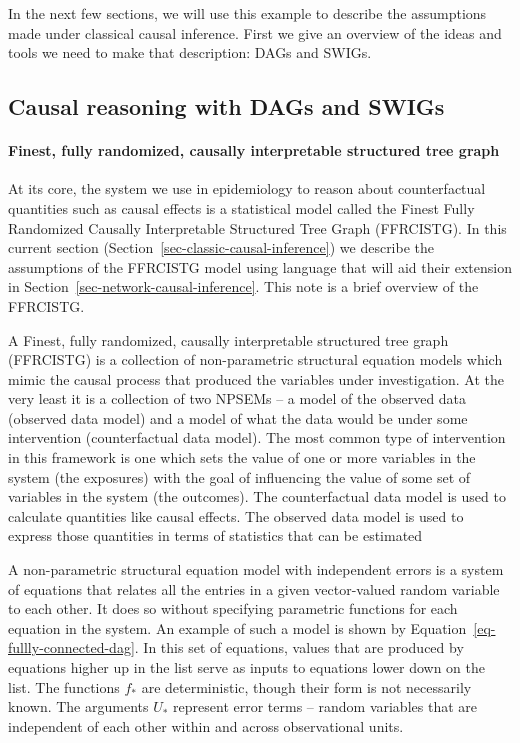 \documentclass[
  letterpaper,
  DIV=11,
  numbers=noendperiod,
  oneside]{scrreprt}
\let\oldparagraph\paragraph
\renewcommand{\paragraph}[1]{\oldparagraph{#1}\mbox{}}
\begin{document}
In the next few sections, we will use this example to describe the
assumptions made under classical causal inference. First we give an
overview of the ideas and tools we need to make that description: DAGs
and SWIGs.

\hypertarget{causal-reasoning-with-dags-and-swigs}{%
\subsection*{Causal reasoning with DAGs and
SWIGs}\label{causal-reasoning-with-dags-and-swigs}}

\hypertarget{finest-fully-randomized-causally-interpretable-structured-tree-graph}{%
\paragraph{Finest, fully randomized, causally interpretable structured
tree
graph}\label{finest-fully-randomized-causally-interpretable-structured-tree-graph}}

At its core, the system we use in epidemiology to reason about
counterfactual quantities such as causal effects is a statistical model
called the Finest Fully Randomized Causally Interpretable Structured
Tree Graph (FFRCISTG). In this current section
(Section~\ref{sec-classic-causal-inference}) we describe the assumptions
of the FFRCISTG model using language that will aid their extension in
Section~\ref{sec-network-causal-inference}. This note is a brief
overview of the FFRCISTG.

A Finest, fully randomized, causally interpretable structured tree graph
(FFRCISTG) is a collection of non-parametric structural equation models
which mimic the causal process that produced the variables under
investigation. At the very least it is a collection of two NPSEMs -- a
model of the observed data (observed data model) and a model of what the
data would be under some intervention (counterfactual data model). The
most common type of intervention in this framework is one which sets the
value of one or more variables in the system (the exposures) with the
goal of influencing the value of some set of variables in the system
(the outcomes). The counterfactual data model is used to calculate
quantities like causal effects. The observed data model is used to
express those quantities in terms of statistics that can be estimated

A non-parametric structural equation model with independent errors is a
system of equations that relates all the entries in a given
vector-valued random variable to each other. It does so without
specifying parametric functions for each equation in the system. An
example of such a model is shown by
Equation~\ref{eq-fullly-connected-dag}. In this set of equations, values
that are produced by equations higher up in the list serve as inputs to
equations lower down on the list. The functions \(f_*\) are
deterministic, though their form is not necessarily known. The arguments
\(U_*\) represent error terms -- random variables that are independent
of each other within and across observational units.
\end{document}
